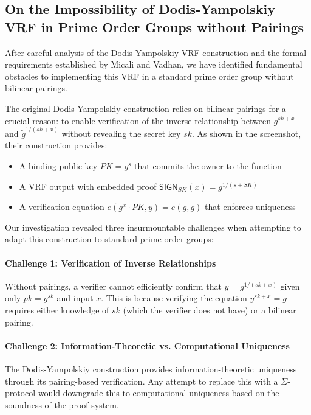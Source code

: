 \subsection{On the Impossibility of Dodis-Yampolskiy VRF in Prime Order Groups without Pairings}

After careful analysis of the Dodis-Yampolskiy VRF construction and the formal requirements established by Micali and Vadhan, we have identified fundamental obstacles to implementing this VRF in a standard prime order group without bilinear pairings.

The original Dodis-Yampolskiy construction relies on bilinear pairings for a crucial reason: to enable verification of the inverse relationship between $g^{sk+x}$ and $\tilde{g}^{1/(sk+x)}$ without revealing the secret key $sk$. As shown in the screenshot, their construction provides:

\begin{itemize}
    \item A binding public key $PK = g^s$ that commits the owner to the function
    \item A VRF output with embedded proof $\textsf{SIGN}_{SK}(x) = g^{1/(s+SK)}$
    \item A verification equation $e(g^x \cdot PK, y) = e(g, g)$ that enforces uniqueness
\end{itemize}

Our investigation revealed three insurmountable challenges when attempting to adapt this construction to standard prime order groups:

\paragraph{Challenge 1: Verification of Inverse Relationships} Without pairings, a verifier cannot efficiently confirm that $y = g^{1/(sk+x)}$ given only $pk = g^{sk}$ and input $x$. This is because verifying the equation $y^{sk+x} = g$ requires either knowledge of $sk$ (which the verifier does not have) or a bilinear pairing.

\paragraph{Challenge 2: Information-Theoretic vs. Computational Uniqueness} The Dodis-Yampolskiy construction provides information-theoretic uniqueness through its pairing-based verification. Any attempt to replace this with a $\Sigma$-protocol would downgrade this to computational uniqueness based on the soundness of the proof system.

